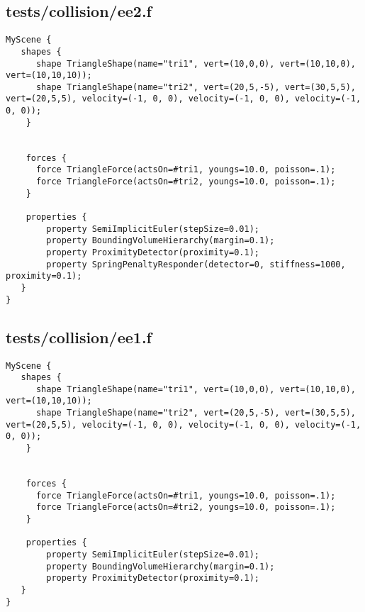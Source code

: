 \subsection*{tests/collision/ee2.f}
\begin{lstlisting}
MyScene {
   shapes {
      shape TriangleShape(name="tri1", vert=(10,0,0), vert=(10,10,0), vert=(10,10,10));
      shape TriangleShape(name="tri2", vert=(20,5,-5), vert=(30,5,5), vert=(20,5,5), velocity=(-1, 0, 0), velocity=(-1, 0, 0), velocity=(-1, 0, 0));
    }

    
    forces {
      force TriangleForce(actsOn=#tri1, youngs=10.0, poisson=.1);
      force TriangleForce(actsOn=#tri2, youngs=10.0, poisson=.1);
    }

    properties { 
        property SemiImplicitEuler(stepSize=0.01);
        property BoundingVolumeHierarchy(margin=0.1);
        property ProximityDetector(proximity=0.1);
        property SpringPenaltyResponder(detector=0, stiffness=1000, proximity=0.1);
   }
}
\end{lstlisting}

\subsection*{tests/collision/ee1.f}
\begin{lstlisting}
MyScene {
   shapes {
      shape TriangleShape(name="tri1", vert=(10,0,0), vert=(10,10,0), vert=(10,10,10));
      shape TriangleShape(name="tri2", vert=(20,5,-5), vert=(30,5,5), vert=(20,5,5), velocity=(-1, 0, 0), velocity=(-1, 0, 0), velocity=(-1, 0, 0));
    }

    
    forces {
      force TriangleForce(actsOn=#tri1, youngs=10.0, poisson=.1);
      force TriangleForce(actsOn=#tri2, youngs=10.0, poisson=.1);
    }

    properties { 
        property SemiImplicitEuler(stepSize=0.01);
        property BoundingVolumeHierarchy(margin=0.1);
        property ProximityDetector(proximity=0.1);
   }
}
\end{lstlisting}

